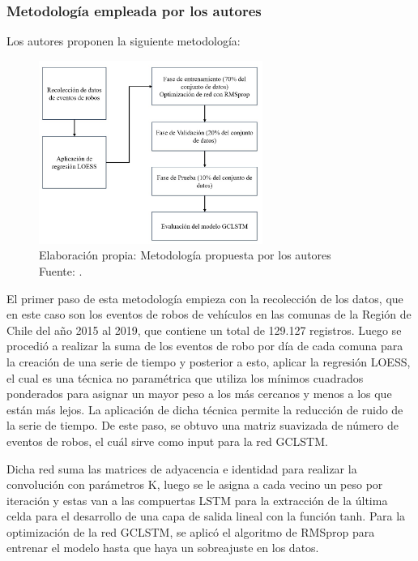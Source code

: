 \subsubsection{Metodología empleada por los autores}
Los autores proponen la siguiente metodología: %


\begin{figure}[h]
	\begin{center}
		\includegraphics[width=0.65\textwidth]{2/figures/ChileMetodo.jpg}
		\caption{Elaboración propia: Metodología propuesta por los autores \\
			Fuente: \citep*{pr_esquivel}. }
		\label{1:fig2}
	\end{center}
\end{figure}
El primer paso de esta metodología empieza con la recolección de los datos, que en este caso son los eventos de robos de vehículos en las comunas de la Región de Chile del año 2015 al 2019, que contiene un total de 129.127 registros. Luego se procedió a realizar la suma de los eventos de robo por día de cada comuna para la creación de una serie de tiempo y posterior a esto, aplicar la regresión LOESS, el cual es una técnica no paramétrica que utiliza los mínimos cuadrados ponderados para asignar un mayor peso a los más cercanos y menos a los que están más lejos. La aplicación de dicha técnica permite la reducción de ruido de la serie de tiempo. De este paso, se obtuvo una matriz suavizada de número de eventos de robos, el cuál sirve como input para la red GCLSTM. 

Dicha red suma las matrices de adyacencia e identidad para realizar la convolución con parámetros K, luego se le asigna a cada vecino un peso por iteración y estas van a las compuertas LSTM para la extracción de la última celda para el desarrollo de una capa de salida lineal con la función tanh. Para la optimización de la red GCLSTM, se aplicó el algoritmo de RMSprop para entrenar el modelo hasta que haya un sobreajuste en los datos.

